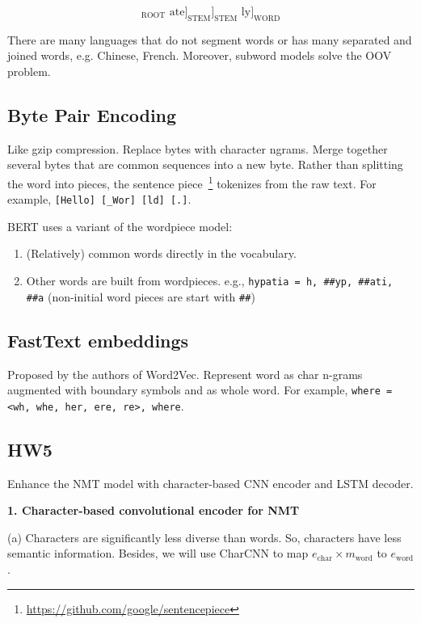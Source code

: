 \begin{equation}
[[\text{un }[[\text{fortun(e)}]_{\text{ROOT}} \text{ ate}]_{\text{STEM}}]_{\text{STEM}}\text{ ly}]_{\text{WORD}} \nonumber
\end{equation}

There are many languages that do not segment words or has many separated and joined words, e.g. Chinese, French.
Moreover, subword models solve the OOV problem.

\subsection{Byte Pair Encoding}

Like gzip compression.
Replace bytes with character ngrams.
Merge together several bytes that are common sequences into a new byte.
Rather than splitting the word into pieces, the sentence piece~\footnote{\url{https://github.com/google/sentencepiece}} tokenizes from the raw text.
For example, \texttt{[Hello] [\_Wor] [ld] [.]}.

BERT uses a variant of the wordpiece model:

\begin{enumerate}
	\item (Relatively) common words directly in the vocabulary.
	\item Other words are built from wordpieces. e.g., \texttt{hypatia = h, \#\#yp, \#\#ati, \#\#a} (non-initial word pieces are start with \texttt{\#\#})
\end{enumerate}

\subsection{FastText embeddings}

Proposed by the authors of Word2Vec.
Represent word as char n-grams augmented with boundary symbols and as whole word.
For example, \texttt{where = <wh, whe, her, ere, re>, where}.

\subsection{HW5}

Enhance the NMT model with character-based CNN encoder and LSTM decoder.

\textbf{1. Character-based convolutional encoder for NMT~}

(a) Characters are significantly less diverse than words. So, characters have less semantic information. Besides, we will use CharCNN to map $e_{\text{char}} \times m_{\text{word}}$ to $e_{\text{word}}$.

